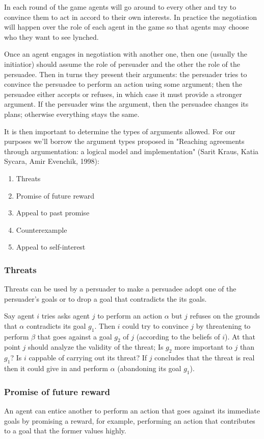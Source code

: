 \documentclass{article}
\begin{document}
In each round of the game agents will go around to every other and try to convince them to act in accord to their own interests. In practice the negotiation will happen over the role of each agent in the game so that agents may choose who they want to see lynched.

Once an agent engages in negotiation with another one, then one (usually the initiatior) should assume the role of persuader and the other the role of the persuadee. Then in turns they present their arguments: the persuader tries to convince the persuadee to perform an action using some argument; then the persuadee either accepts or refuses, in which case it must provide a stronger argument. If the persuader wins the argument, then the persuadee changes its plans; otherwise everything stays the same.

It is then important to determine the types of arguments allowed. For our purposes we'll borrow the argument types proposed in "Reaching agreements through argumentation: a logical model and implementation" (Sarit Kraus, Katia Sycara, Amir Evenchik, 1998):
\begin{enumerate}
\item{Threats}
\item{Promise of future reward}
\item{Appeal to past promise}
\item{Counterexample}
\item{Appeal to self-interest}
\end{enumerate}

\subsubsection{Threats}
Threats can be used by a persuader to make a persuadee adopt one of the persuader's goals or to drop a goal that contradicts the its goals. 

Say agent $i$ tries asks agent $j$ to perform an action $\alpha$ but $j$ refuses on the grounds that $\alpha$ contradicts its goal $g_1$. Then $i$ could try to convince $j$ by threatening to perform $\beta$ that goes against a goal $g_2$ of $j$ (according to the beliefs of $i$). At that point $j$ should analyze the validity of the threat; Is $g_2$ more important to $j$ than $g_1$? Is $i$ cappable of carrying out its threat? If $j$ concludes that the threat is real then it could give in and perform $\alpha$ (abandoning its goal $g_1$).

\subsubsection{Promise of future reward}
An agent can entice another to perform an action that goes against its immediate goals by promising a reward, for example, performing an action that contributes to a goal that the former values highly. 
\end{document}
